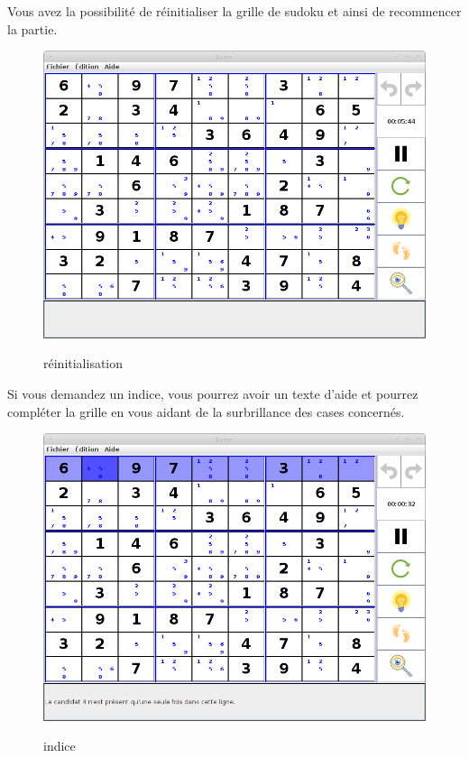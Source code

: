 \newpage
Vous avez la possibilité de réinitialiser la grille de sudoku 
et ainsi de recommencer la partie. 
\begin{figure}[ht]
  \caption{\label{annexe12} réinitialisation}
  \includegraphics [width=130mm]{images/reinit.png} \\[0.5cm]
\end{figure}

\newpage
Si vous demandez un indice, vous pourrez avoir un texte d'aide 
et pourrez compléter la grille en vous aidant de la surbrillance 
des cases concernés.  
\begin{figure}[ht]
  \caption{\label{annexe13} indice}
  \includegraphics [width=130mm]{images/clue.png} \\[0.5cm]
\end{figure}

